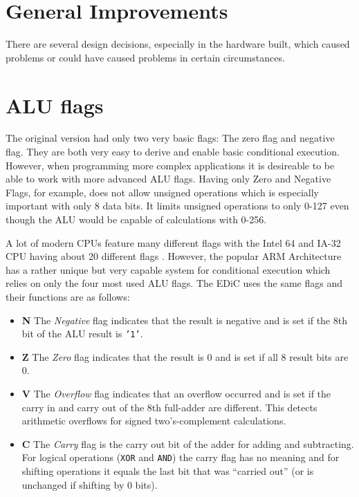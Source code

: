 
\section{General Improvements}\label{sec:improvements}
There are several design decisions, especially in the hardware built, which caused problems or could have caused problems in certain circumstances.

\section{\gls{ALU} flags}\label{sec:aluFlags}
The original version had only two very basic flags: The zero flag and negative flag.
They are both very easy to derive and enable basic conditional execution.
However, when programming more complex applications it is desireable to be able to work with more advanced \gls{ALU} flags.
Having only Zero and Negative Flags, for example, does not allow unsigned operations which is especially important with only 8 data bits.
It limits unsigned operations to only 0-127 even though the \gls{ALU} would be capable of calculations with 0-256.

A lot of modern \glspl{CPU} feature many different flags with the Intel 64\textsuperscript{\textregistered} and IA-32 \gls{CPU} having about 20 different flags \cite[Section~3.4.3]{intelx86}.
However, the popular ARM Architecture has a rather unique but very capable system for conditional execution which relies on only the four most used \gls{ALU} flags.
The \gls{EDiC} uses the same flags and their functions are as follows:
\begin{itemize}
  \item \textbf{N} The \emph{Negative} flag indicates that the result is negative and is set if the 8th bit of the \gls{ALU} result is \texttt{'1'}.
  \item \textbf{Z} The \emph{Zero} flag indicates that the result is 0 and is set if all 8 result bits are 0.
  \item \textbf{V} The \emph{Overflow} flag indicates that an overflow occurred and is set if the carry in and carry out of the 8th full-adder are different.
  This detects arithmetic overflows for signed two's-complement calculations.
  \item \textbf{C} The \emph{Carry} flag is the carry out bit of the adder for adding and subtracting.
  For logical operations (\texttt{XOR} and \texttt{AND}) the carry flag has no meaning and for shifting operations it equals the last bit that was ``carried out'' (or is unchanged if shifting by 0 bits).
\end{itemize}

